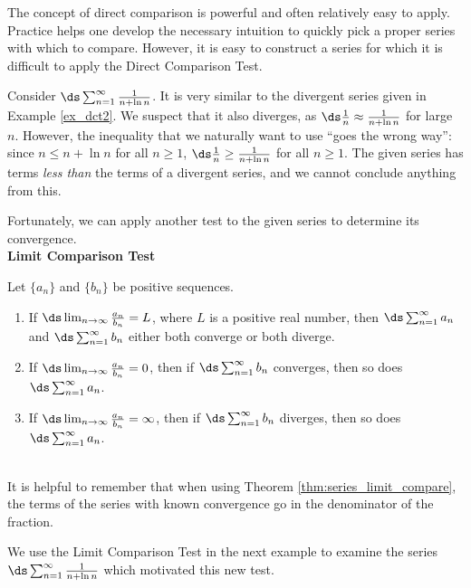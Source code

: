 The concept of direct comparison is powerful and often relatively easy to apply. Practice helps one develop the necessary intuition to quickly pick a proper series with which to compare. However, it is easy to construct a series for which it is difficult to apply the Direct Comparison Test. 

Consider $\ds\sum_{n=1}^\infty \frac1{n+\ln n}$. It is very similar to the divergent series given in Example \ref{ex_dct2}. We suspect that it also diverges, as $\ds \frac 1n \approx \frac1{n+\ln n}$ for large $n$. However, the inequality that we naturally want to use ``goes the wrong way'': since $n\leq n+\ln n$ for all $n\geq 1$, $\ds\frac1n \geq \frac{1}{n+\ln n}$ for all $n\geq 1$. The given series has terms \textit{less than} the terms of a divergent series, and we cannot conclude anything from this.

Fortunately, we can apply another test to the given series to determine its convergence.\\

\noindent\textbf{\large Limit Comparison Test}\\

{Let $\{a_n\}$ and $\{b_n\}$ be positive sequences.
	\begin{enumerate}
		\item If $\ds\lim_{n\to\infty} \frac{a_n}{b_n} = L$, where $L$ is a positive real number, then $\ds \sum_{n=1}^\infty a_n$ and $\ds \sum_{n=1}^\infty b_n$ either both converge or both diverge.
		\item	If $\ds\lim_{n\to\infty} \frac{a_n}{b_n} = 0$, then if $\ds \sum_{n=1}^\infty b_n$ converges, then so does $\ds \sum_{n=1}^\infty a_n$.
		\item	If $\ds\lim_{n\to\infty} \frac{a_n}{b_n} = \infty$, then if $\ds \sum_{n=1}^\infty b_n$ diverges, then so does $\ds \sum_{n=1}^\infty a_n$.
	\end{enumerate}
}\\

It is helpful to remember that when using Theorem \ref{thm:series_limit_compare}, the terms of the series with known convergence go in the denominator of the fraction.

We use the Limit Comparison Test in the next example to examine the series $\ds\sum_{n=1}^\infty \frac1{n+\ln n}$ which motivated this new test.\\

